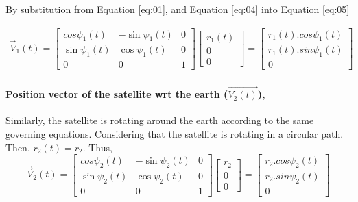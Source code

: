 \documentclass[11pt]{article}
\begin{document}
By substitution from Equation \ref{eq:01}, and Equation \ref{eq:04} into Equation \ref{eq:05}

\begin{gather}\label{eq:06}
\vec{V}_1(t) = \begin{bmatrix}
            cos{\psi_1(t)}  &  -\sin{\psi_1(t)}  &  0    \\
            \sin{\psi_1(t)}&   \cos{\psi_1(t)}    & 0\\
            0          &    0   & 1          
            \end{bmatrix}  \begin{bmatrix}
            r_1(t)   \\
            0 \\
             0             
            \end{bmatrix}  
            = \begin{bmatrix}
            r_1(t) . cos{\psi_1(t)}  \\
            r_1(t) . sin{\psi_1(t)} \\
             0             
            \end{bmatrix}
\end{gather}

\paragraph{Position vector of the satellite wrt the earth ($\vec{V_2(t)}$),}


Similarly, the satellite is rotating around the earth according to the same governing equations. Considering that the satellite is rotating in a circular path. Then, $r_2(t) = r_2$. Thus,
\begin{equation}
    \vec{V}_2(t) = \begin{bmatrix}
            cos{\psi_2(t)}  &  -\sin{\psi_2(t)}  &  0    \\
            \sin{\psi_2(t)}&   \cos{\psi_2(t)}    & 0\\
            0          &    0   & 1          
            \end{bmatrix}  \begin{bmatrix}
            r_2   \\
            0 \\
             0             
            \end{bmatrix}  
            = \begin{bmatrix}
            r_2 . cos{\psi_2(t)}  \\
            r_2 . sin{\psi_2(t)} \\
             0             
            \end{bmatrix}
\end{equation}
\end{document}
